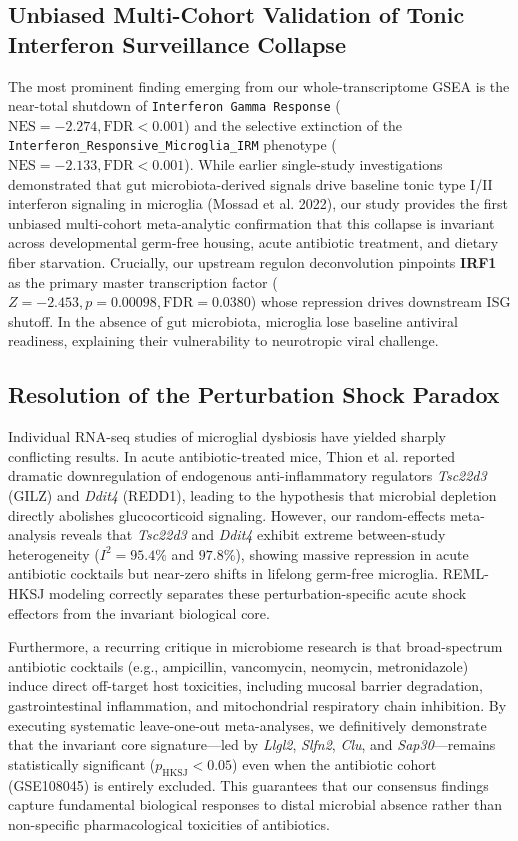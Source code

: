 \documentclass[10pt,a4paper]{article}
\begin{document}
\subsection{Unbiased Multi-Cohort Validation of Tonic Interferon Surveillance Collapse}
The most prominent finding emerging from our whole-transcriptome GSEA is the near-total shutdown of \texttt{\small Interferon Gamma Response} ($\text{NES} = -2.274, \text{FDR} < 0.001$) and the selective extinction of the \texttt{\small Interferon\_Responsive\_Microglia\_IRM} phenotype ($\text{NES} = -2.133, \text{FDR} < 0.001$). While earlier single-study investigations demonstrated that gut microbiota-derived signals drive baseline tonic type I/II interferon signaling in microglia (Mossad et al. 2022)\cite{mossad2021_9}, our study provides the first unbiased multi-cohort meta-analytic confirmation that this collapse is invariant across developmental germ-free housing, acute antibiotic treatment, and dietary fiber starvation. Crucially, our upstream regulon deconvolution pinpoints \textbf{IRF1} as the primary master transcription factor ($Z = -2.453, p = 0.00098, \text{FDR} = 0.0380$) whose repression drives downstream ISG shutoff. In the absence of gut microbiota, microglia lose baseline antiviral readiness, explaining their vulnerability to neurotropic viral challenge\cite{brown2019_24,winkler2020_25}.

\subsection{Resolution of the Perturbation Shock Paradox}
Individual RNA-seq studies of microglial dysbiosis have yielded sharply conflicting results. In acute antibiotic-treated mice, Thion et al. reported dramatic downregulation of endogenous anti-inflammatory regulators \textit{Tsc22d3} (GILZ) and \textit{Ddit4} (REDD1)\cite{thion2018_13}, leading to the hypothesis that microbial depletion directly abolishes glucocorticoid signaling. However, our random-effects meta-analysis reveals that \textit{Tsc22d3} and \textit{Ddit4} exhibit extreme between-study heterogeneity ($I^2 = 95.4\%$ and $97.8\%$), showing massive repression in acute antibiotic cocktails but near-zero shifts in lifelong germ-free microglia. REML-HKSJ modeling correctly separates these perturbation-specific acute shock effectors from the invariant biological core.

Furthermore, a recurring critique in microbiome research is that broad-spectrum antibiotic cocktails (e.g., ampicillin, vancomycin, neomycin, metronidazole) induce direct off-target host toxicities, including mucosal barrier degradation, gastrointestinal inflammation, and mitochondrial respiratory chain inhibition\cite{kennedy2020_20}. By executing systematic leave-one-out meta-analyses, we definitively demonstrate that the invariant core signature---led by \textit{Llgl2}, \textit{Slfn2}, \textit{Clu}, and \textit{Sap30}---remains statistically significant ($p_{\text{HKSJ}} < 0.05$) even when the antibiotic cohort (GSE108045) is entirely excluded. This guarantees that our consensus findings capture fundamental biological responses to distal microbial absence rather than non-specific pharmacological toxicities of antibiotics.
\end{document}
